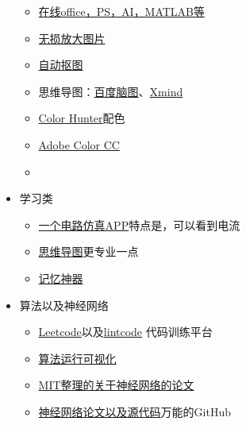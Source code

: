 \documentclass[UTF8,oneside]{ctexbook}
\begin{document}
\begin{itemize}
\begin{itemize}
		      \item \href{https://uzer.me/u/signin}{在线office，PS，AI，MATLAB等}
		      \item \href{https://bigjpg.com}{无损放大图片}
		      \item \href{https://www.remove.bg}{自动抠图}
		      \item 思维导图：\href{http://naotu.baidu.com/file/97d9cd5ca30672903a3e3321e62c6ed8}{百度脑图}、\href{https://www.xmind.net/}{Xmind}
		      \item \href{http://www.colorhunter.com}{Color Hunter}\quad 配色
		      \item \href{https://color.adobe.com/zh/create/color-wheel/?base=2&rule=Analogous&selected=0&name=我的%20Color%20主題&mode=rgb&rgbvalues=1,0.8549019607843137,0.598371339694025,0.91,0.33228399543185755,0.04550000000000004,1,0,0,0.8452221384131547,0.04550000000000004,0.91,0.3394492552539419,0.050000000000000044,1&swatchOrder=0,1,2,3,4}{Adobe Color CC}
		      \item
	      \end{itemize}
	\item 学习类
	      \begin{itemize}
		      \item \href{https://www.52pojie.cn/thread-716675-1-1.html}{一个电路仿真APP}\quad 特点是，可以看到电流
		      \item \href{https://mm.edrawsoft.cn/map.html?obj=wxoa3v5wBLcpmgCifx59_Uzk5X4qHU/Personal/未命名文件.emmx}{思维导图}更专业一点
		      \item \href{https://ankiweb.net/shared/decks/}{记忆神器}
	      \end{itemize}
	\item 算法以及神经网络
	      \begin{itemize}
		      \item \href{https://leetcode.com}{Leetcode}以及\href{https://www.lintcode.com/zh-cn/accounts/signup/}{lintcode} 代码训练平台
		      \item \href{https://algorithm-visualizer.org}{算法运行可视化}
		      \item \href{https://www.stateoftheart.ai}{MIT整理的关于神经网络的论文}
		      \item \href{https://github.com/lonelybag/pwc}{神经网络论文以及源代码}\quad 万能的GitHub
	      \end{itemize}
\end{itemize}
\end{document}
